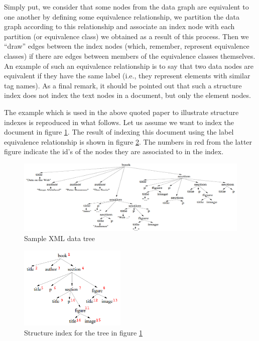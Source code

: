 \documentclass[a4paper,10pt]{article}
\begin{document}
Simply put, we consider that some nodes from the data graph are equivalent to one
another by defining some equivalence relationship, we partition the data graph according
to this relationship and associate an index node with each partition (or equivalence class)
we obtained as a result of this process. Then we ``draw'' edges between the index nodes
(which, remember, represent equivalence classes) if there are edges between members
of the equivalence classes themselves. An example of such an equivalence relationship is
to say that two data nodes are equivalent if they have the same label (i.e., they represent
elements with similar tag names). As a final remark, it should be pointed out that such
a structure index does not index the text nodes in a document, but only the element nodes.

The example which is used in the above quoted paper to illustrate structure indexes is reproduced
in what follows. Let us assume we want to index the document in figure \ref{fig:xmldt}. The result
of indexing this document using the label equivalence relationship is shown in figure
\ref{fig:xmlidx}. The numbers in red from the latter figure indicate the id's of the nodes they
are associated to in the index.

\begin{figure}[ht]
\begin{center}
\includegraphics[width=\linewidth]{img/xmldt.png}
\end{center}
\caption{Sample XML data tree}
\label{fig:xmldt}
\end{figure}

\begin{figure}[ht]
\begin{center}
\includegraphics[width=2in]{img/xmlidx.png}
\end{center}
\caption{Structure index for the tree in figure \ref{fig:xmldt}}
\label{fig:xmlidx}
\end{figure}
\end{document}
